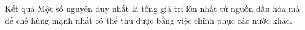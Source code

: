 Kết quả
Một số nguyên duy nhất là tổng giá trị lớn nhất từ nguồn dầu hỏa mà đế chế hùng mạnh nhất có thể thu được bằng việc chinh phục các nước khác.